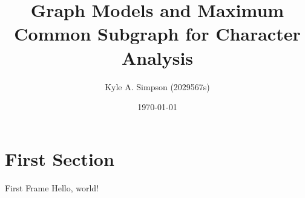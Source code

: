 \documentclass{beamer}
\title{Graph Models and Maximum Common Subgraph for Character Analysis}
\date{\today}
\author{Kyle A. Simpson (2029567s)}
\institute{University of Glasgow}
\begin{document}
  \maketitle
  \section{First Section}
  \begin{frame}{First Frame}
    Hello, world!
  \end{frame}
\end{document}
